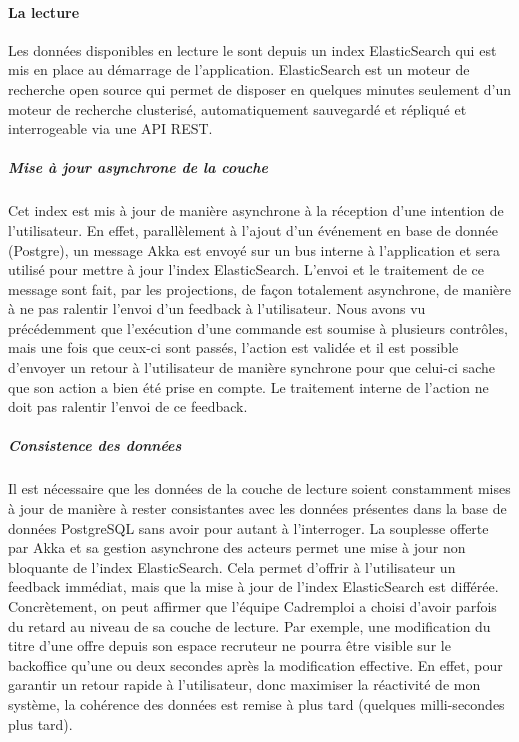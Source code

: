 \paragraph{La lecture}
\label{par:La lecture}
Les données disponibles en lecture le sont depuis un index ElasticSearch qui est mis en place au démarrage de l'application.
\label{def:ElasticSearch}ElasticSearch est un moteur de recherche open source qui permet de disposer en quelques minutes seulement d'un moteur de recherche clusterisé, automatiquement sauvegardé et répliqué et interrogeable via une API REST.
\subparagraph{Mise à jour asynchrone de la couche}
Cet index est mis à jour de manière asynchrone à la réception d'une intention de l'utilisateur.
En effet, parallèlement à l'ajout d'un événement en base de donnée (Postgre), un message Akka est envoyé sur un bus interne à l'application et sera utilisé pour mettre à jour l'index ElasticSearch.
L'envoi et le traitement de ce message sont fait, par les projections, de façon totalement asynchrone, de manière à ne pas ralentir l'envoi d'un feedback à l'utilisateur.
Nous avons vu précédemment que l'exécution d'une commande est soumise à plusieurs contrôles, mais une fois que ceux-ci sont passés, l'action est validée et il est possible d'envoyer un retour à l'utilisateur de manière synchrone pour que celui-ci sache que son action a bien été prise en compte.
Le traitement interne de l'action ne doit pas ralentir l'envoi de ce feedback.
\subparagraph{Consistence des données}
Il est nécessaire que les données de la couche de lecture soient constamment mises à jour de manière à rester consistantes avec les données présentes dans la base de données PostgreSQL sans avoir pour autant à l'interroger.
La souplesse offerte par Akka et sa gestion asynchrone des acteurs permet une mise à jour non bloquante de l'index ElasticSearch.
Cela permet d'offrir à l'utilisateur un feedback immédiat, mais que la mise à jour de l'index ElasticSearch est différée.
Concrètement, on peut affirmer que l'équipe Cadremploi a choisi d'avoir parfois du retard au niveau de sa couche de lecture.
Par exemple, une modification du titre d'une offre depuis son espace recruteur ne pourra être visible sur le backoffice qu'une ou deux secondes après la modification effective.
En effet, pour garantir un retour rapide à l'utilisateur, donc maximiser la réactivité de mon système, la cohérence des données est remise à plus tard (quelques milli-secondes plus tard).
